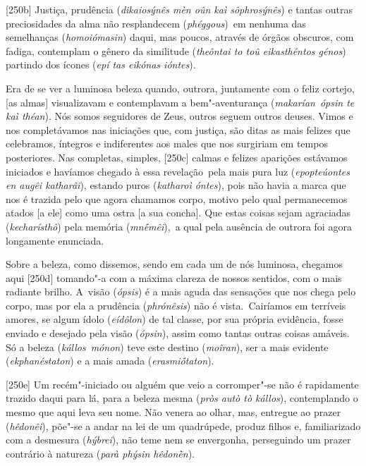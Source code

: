 [250b] Justiça, prudência (\emph{dikaiosýnês mèn oûn kaì
sôphrosýnês}) e tantas outras preciosidades da alma não resplandecem
(\emph{phéggous})~em nenhuma das semelhanças (\emph{homoiómasin}) daqui,
mas poucos, através de órgãos obscuros, com fadiga, contemplam o gênero
da similitude (\emph{theôntai to toû eikasthéntos génos}) partindo dos
ícones (\emph{epí tas eikónas ióntes}).

Era de se ver a luminosa beleza quando, outrora, juntamente com o feliz
cortejo, [as almas] visualizavam e contemplavam a bem"-aventurança
(\emph{makarían}~\emph{ópsin te kaì théan}). Nós somos seguidores de
Zeus, outros seguem outros deuses. Vimos e nos completávamos nas
iniciações que, com justiça, são ditas as mais felizes que celebramos,
íntegros e indiferentes aos males que nos surgiriam em tempos
posteriores. Nas completas, simples, [250c] calmas e felizes
aparições estávamos iniciados e havíamos chegado à essa revelação~pela
mais pura luz (\emph{epopteúontes en augêi katharâi}), estando puros
(\emph{katharoì óntes}), pois não havia a marca que nos é trazida pelo
que agora chamamos corpo, motivo pelo qual permanecemos atados [a
ele] como uma ostra [a sua concha]. Que estas coisas sejam
agraciadas (\emph{kecharísthô}) pela memória (\emph{mnḗmêi}),~a qual
pela ausência de outrora foi agora longamente enunciada.

Sobre a beleza, como dissemos, sendo em cada um de nós luminosa,
chegamos aqui [250d] tomando"-a com a máxima clareza de nossos
sentidos, com o mais radiante brilho. A~visão (\emph{ópsis}) é a mais
aguda das sensações que nos chega pelo corpo, mas por ela a prudência
(\emph{phrónêsis}) não é vista.~Cairíamos em terríveis amores, se algum
ídolo (\emph{eídôlon}) de tal classe, por sua própria evidência, fosse
enviado e desejado pela visão (\emph{ópsin}), assim como tantas outras
coisas amáveis. Só a beleza (\emph{kállos}~\emph{mónon}) teve este
destino (\emph{moîran}), ser a mais evidente (\emph{ekphanéstaton}) e a
mais amada (\emph{erasmiṓtaton}).

[250e] Um recém"-iniciado ou alguém que veio a corromper"-se não é
rapidamente trazido daqui para lá, para a beleza mesma (\emph{pròs autò
tò kállos}), contemplando o mesmo que aqui leva seu nome. Não venera ao
olhar, mas, entregue ao prazer (\emph{hêdonêi}), põe"-se a andar na lei de
um quadrúpede, produz filhos e, familiarizado com a desmesura
(\emph{hýbrei}), não teme nem se envergonha, perseguindo um prazer
contrário à natureza (\emph{parà phýsin hêdonḕn}).

